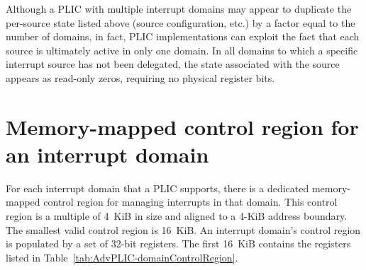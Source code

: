 \begin{commentary}
Although a PLIC with multiple interrupt domains may appear to duplicate
the per-source state listed above (source configuration, etc.) by a
factor equal to the number of domains, in fact, PLIC implementations
can exploit the fact that each source is ultimately active in only one
domain.
In all domains to which a specific interrupt source has not been
delegated, the state associated with the source appears as read-only
zeros, requiring no physical register bits.
\end{commentary}

\section{Memory-mapped control region for an interrupt domain}
\label{sec:AdvPLIC-domainControlRegion}

For each interrupt domain that a PLIC supports, there is a dedicated
memory-mapped control region for managing interrupts in that domain.
This control region is a multiple of 4~KiB in size and aligned to a
\mbox{4-KiB} address boundary.
The smallest valid control region is 16~KiB.
An interrupt domain's control region is populated by a set of
\mbox{32-bit} registers.
The first 16~KiB contains the registers listed in
Table~\ref{tab:AdvPLIC-domainControlRegion}.

